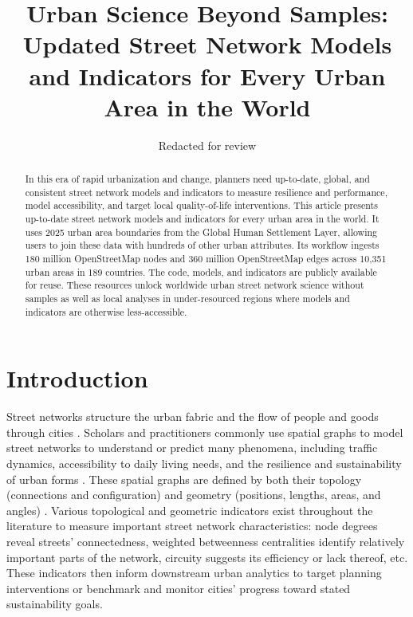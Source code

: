 \documentclass[12pt,letterpaper]{article} %
\newcommand{\myname}{Geoff Boeing}
\newcommand{\myorcid}{0000-0003-1851-6411}  %
\newcommand{\myaffiliation}{Department of Urban Planning and Spatial Analysis\\University of Southern California}
\newcommand{\paperdate}{April 2025}
\newcommand{\papertitle}{Urban Science Beyond Samples: Updated Street Network Models and Indicators for Every Urban Area in the World}
\newcommand{\papercitation}{Boeing, G. 2025. \papertitle. Under review at \textit{Journal Name}.}
\begin{document}
\title{\papertitle}%
\author[]{Redacted for review}%
\date{}%

\maketitle

\begin{abstract}

In this era of rapid urbanization and change, planners need up-to-date, global, and consistent street network models and indicators to measure resilience and performance, model accessibility, and target local quality-of-life interventions. This article presents up-to-date street network models and indicators for every urban area in the world. It uses 2025 urban area boundaries from the Global Human Settlement Layer, allowing users to join these data with hundreds of other urban attributes. Its workflow ingests 180 million OpenStreetMap nodes and 360 million OpenStreetMap edges across 10,351 urban areas in 189 countries. The code, models, and indicators are publicly available for reuse. These resources unlock worldwide urban street network science without samples as well as local analyses in under-resourced regions where models and indicators are otherwise less-accessible.

\end{abstract}


\section{Introduction}

Street networks structure the urban fabric and the flow of people and goods through cities \citep{barrington-leigh_global_2020}. Scholars and practitioners commonly use spatial graphs to model street networks to understand or predict many phenomena, including traffic dynamics, accessibility to daily living needs, and the resilience and sustainability of urban forms \citep{barthelemy_spatial_2022}. These spatial graphs are defined by both their topology (connections and configuration) and geometry (positions, lengths, areas, and angles) \citep{fischer_spatial_2014}. Various topological and geometric indicators exist throughout the literature to measure important street network characteristics: node degrees reveal streets' connectedness, weighted betweenness centralities identify relatively important parts of the network, circuity suggests its efficiency or lack thereof, etc. These indicators then inform downstream urban analytics to target planning interventions or benchmark and monitor cities' progress toward stated sustainability goals.
\end{document}
